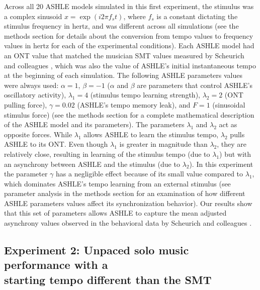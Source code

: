 \documentclass{report}
\begin{document}
Across all 20 ASHLE models simulated in this first experiment, the stimulus was a complex sinusoid $x=\exp(i2\pi f_s t)$, where $f_s$ is a constant dictating the stimulus frequency in hertz, and was different across all simulations (see the methods section for details about the conversion from tempo values to frequency values in hertz for each of the experimental conditions). Each ASHLE model had an ONT value that matched the musician SMT values measured by Scheurich and colleagues \cite{scheurich2018tapping}, which was also the value of ASHLE's initial instantaneous tempo at the beginning of each simulation. The following ASHLE parameters values were always used: $\alpha=1$, $\beta=−1$ ($\alpha$ and $\beta$ are parameters that control ASHLE's oscillatory activity), $\lambda_1=4$ (stimulus tempo learning strength), $\lambda_2=2$ (ONT pulling force), $\gamma=0.02$ (ASHLE's tempo memory leak), and $F=1$ (sinusoidal stimulus force) (see the methods section for a complete mathematical description of the ASHLE model and its parameters). The parameters $\lambda_1$ and $\lambda_2$ act as opposite forces. While $\lambda_1$ allows ASHLE to learn the stimulus tempo, $\lambda_2$ pulls ASHLE to its ONT. Even though $\lambda_1$ is greater in magnitude than $\lambda_2$, they are relatively close, resulting in learning of the stimulus tempo (due to $\lambda_1$) but with an asynchrony between ASHLE and the stimulus (due to $\lambda_2$). In this experiment the parameter $\gamma$ has a negligible effect because of its small value compared to $\lambda_1$, which dominates ASHLE's tempo learning from an external stimulus (see parameter analysis in the methods section for an examination of how different ASHLE parameters values affect its synchronization behavior). Our results show that this set of parameters allows ASHLE to capture the mean adjusted asynchrony values observed in the behavioral data by Scheurich and colleagues \cite{scheurich2018tapping}.

\subsection{Experiment 2: Unpaced solo music performance with a \\ starting tempo different than the SMT}
\end{document}
